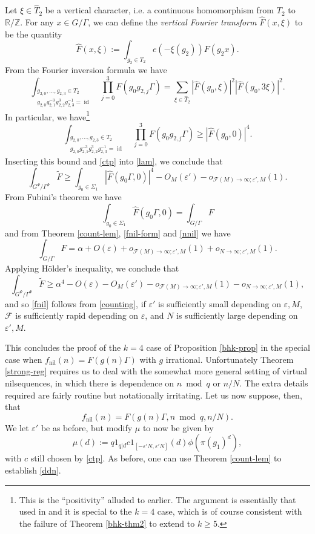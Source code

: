 \documentclass[11pt,reqno]{amsart}
\numberwithin{equation}{section}
\theoremstyle{plain}
\theoremstyle{definition}
\renewcommand{\geq}{\geqslant}
\renewcommand{\mod}{{\ \operatorname{mod}\ }}
\newcommand\Z{\mathbb{Z}}
\newcommand\R{\mathbb{R}}
\newcommand\1{{\bf 1}}
\newcommand\2{{\bf 2}}
\newcommand\eps{\varepsilon}
\newcommand\id{\operatorname{id}}
\newcommand\nil{{\operatorname{nil}}}
\newcommand\Grow{{\mathcal F}}
\begin{document}
Let $\xi\in \hat T_2$ be a vertical character, i.e. a continuous homomorphism from $T_2$ to $\R/\Z$.  For any $x \in  G/\Gamma$, we can define the \emph{vertical Fourier transform} $\hat F(x,\xi)$ to be the quantity
$$ \hat F(x,\xi) := \int_{g_2 \in T_2} e(-\xi(g_2)) F(g_2 x).$$
From the Fourier inversion formula we have
$$ \int_{\substack{g_{2,0},\ldots,g_{2,3} \in T_2 \\ g_{2,0} g_{2,1}^{-3} g_{2,2}^3 g_{2,3}^{-1}=\id}} \prod_{j=0}^3 F( g_0 g_{2,j} \Gamma ) = \sum_{\xi \in \hat T_2} |\hat F(g_0,\xi)|^2 |\hat F(g_0,3\xi)|^2.$$
In particular, we have\footnote{This is the ``positivity'' alluded to earlier.  The argument is essentially that used in \cite{bergelson-host-kra}  and it is special to the $k=4$ case, which is of course consistent with the failure of Theorem \ref{bhk-thm2} to extend to $k \geq 5$.}
$$ \int_{\substack{g_{2,0},\ldots,g_{2,3} \in T_2 \\ g_{2,0} g_{2,1}^{-3} g_{2,2}^3 g_{2,3}^{-1}=\id}} \prod_{j=0}^3 F( g_0 g_{2,j} \Gamma ) \geq |\hat F(g_0,0)|^4.$$
Inserting this bound and \eqref{ctp} into \eqref{lam}, we conclude that
$$
\int_{G^{\Psi}/\Gamma^{\Psi}} \tilde F \geq
\int_{g_0 \in \Sigma_1} |\hat F(g_0 \Gamma,0)|^4 - O_M(\eps') - o_{\Grow(M) \to \infty; \eps',M}(1).$$
From Fubini's theorem we have
$$ \int_{g_0 \in \Sigma_1} \hat F(g_0 \Gamma,0) = \int_{G/\Gamma} F$$
and from Theorem \ref{count-lem}, \eqref{fnil-form} and \eqref{nnil} we have
$$ \int_{G/\Gamma} F = \alpha + O(\eps) + o_{\Grow(M) \to \infty; \eps',M}(1) + o_{N \to \infty; \eps',M}(1)
.$$
Applying H\"older's inequality, we conclude that
$$
\int_{G^{\Psi}/\Gamma^{\Psi}} \tilde F \geq
\alpha^4 - O(\eps) - O_M(\eps') - o_{\Grow(M) \to \infty; \eps',M}(1) - o_{N \to \infty; \eps',M}(1),$$
and so \eqref{fnil} follows from \eqref{counting}, if $\eps'$ is sufficiently small depending on $\eps,M$, $\Grow$ is sufficiently rapid depending on $\eps$, and $N$ is sufficiently large depending on $\eps',M$.

This concludes the proof of the $k=4$ case of Proposition \ref{bhk-prop} in the special case when $f_\nil(n) = F(g(n)\Gamma)$ with $g$ irrational. Unfortunately Theorem \ref{strong-reg} requires us to deal with the somewhat more general setting of virtual nilsequences, in which there is dependence on $n \mod q$ or $n/N$. The extra details required are fairly routine but notationally irritating. Let us now suppose, then, that
\begin{equation}\label{fnil-form-2}
f_\nil(n) = F(g(n) \Gamma, n \mod q, n/N).
\end{equation}
We let $\eps'$ be as before, but modify $\mu$ to now be given by
$$ \mu(d) := q 1_{q|d} c 1_{[-\eps'N,\eps'N]}(d) \phi(\pi(g_1)^d),$$
with $c$ still chosen by \eqref{ctp}.  As before, one can use Theorem \ref{count-lem} to establish \eqref{ddn}.
\end{document}
